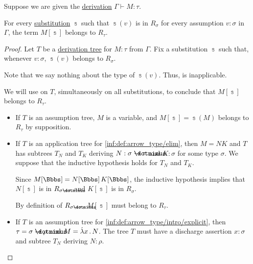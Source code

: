 \begin{lemma}\label{thm:reducibility_candidate_substitution}
  Suppose we are given the \hyperref[def:simple_type_derivability]{derivation} \( \Gamma \vdash M: \tau \).

  For every \hyperref[def:lambda_term_substitution]{substitution} \( \Bbbs \) such that \( \Bbbs(v) \) is in \( R_\sigma \) for every assumption \( v: \sigma \) in \( \Gamma \), the term \( M[\Bbbs] \) belongs to \( R_\tau \).
\end{lemma}
\begin{proof}
  Let \( T \) be a \hyperref[def:type_derivation_tree]{derivation tree} for \( M: \tau \) from \( \Gamma \). Fix a substitution \( \Bbbs \) such that, whenever \( v: \sigma \), \( \Bbbs(v) \) belongs to \( R_\sigma \).

  Note that we say nothing about the type of \( \Bbbs(v) \). Thus,  is inapplicable.

  We will use  on \( T \), simultaneously on all substitutions, to conclude that \( M[\Bbbs] \) belongs to \( R_\tau \).
  \begin{itemize}
    \item If \( T \) is an assumption tree, \( M \) is a variable, and \( M[\Bbbs] = \Bbbs(M) \) belongs to \( R_\tau \) by supposition.

    \item If \( T \) is an application tree for \ref{inf:def:arrow_type/elim}, then \( M = NK \) and \( T \) has subtrees \( T_N \) and \( T_K \) deriving \( N: \sigma \synimplies \tau \) and \( K: \sigma \) for some type \( \sigma \). We suppose that the inductive hypothesis holds for \( T_N \) and \( T_K \).

    Since \( M[\Bbbs] = N[\Bbbs] \thinspace K[\Bbbs] \), the inductive hypothesis implies that \( N[\Bbbs] \) is in \( R_{\sigma \synimplies \tau} \) and \( K[\Bbbs] \) is in \( R_\sigma \).

    By definition of \( R_{\sigma \synimplies \tau} \), \( M[\Bbbs] \) must belong to \( R_\tau \).

    \item If \( T \) is an assumption tree for \ref{inf:def:arrow_type/intro/explicit}, then \( \tau = \sigma \synimplies \rho \) and \( M = \qabs x N \). The tree \( T \) must have a discharge assertion \( x: \sigma \) and subtree \( T_N \) deriving \( N: \rho \).


\end{itemize}
\end{proof}
